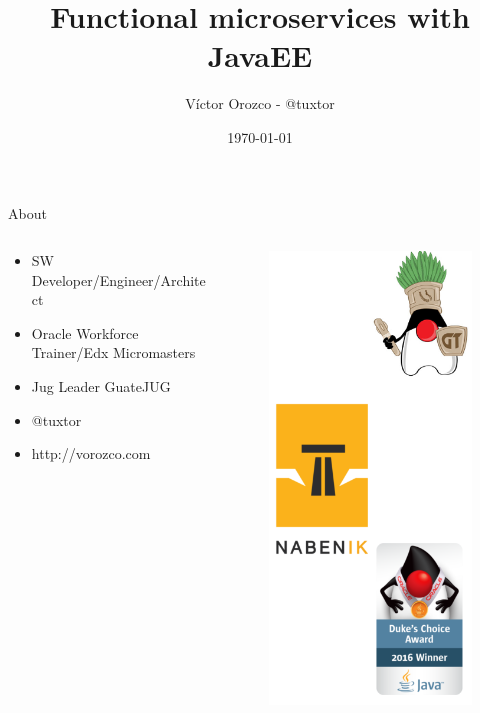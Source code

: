 \documentclass{beamer}
\title{Functional microservices with JavaEE}
\author{Víctor Orozco - @tuxtor}
\institute{GuateJUG}
\date{\today}
\begin{document}
\frame{\titlepage}

\begin{frame}{About}
\begin{columns}[T] %
	\begin{column}[T]{5cm} %
		\begin{itemize}
			\item SW Developer/Engineer/Architect
			\item Oracle Workforce Trainer/Edx Micromasters
			\item Jug Leader GuateJUG
			\item @tuxtor
			\item http://vorozco.com
		\end{itemize}
	\end{column}
	\begin{column}[T]{5cm} %
		\begin{figure}
			\centering
			\includegraphics[width=0.7\linewidth]{Images/logos}
		\end{figure}
		
	\end{column}
\end{columns}
\end{frame}
\end{document}
